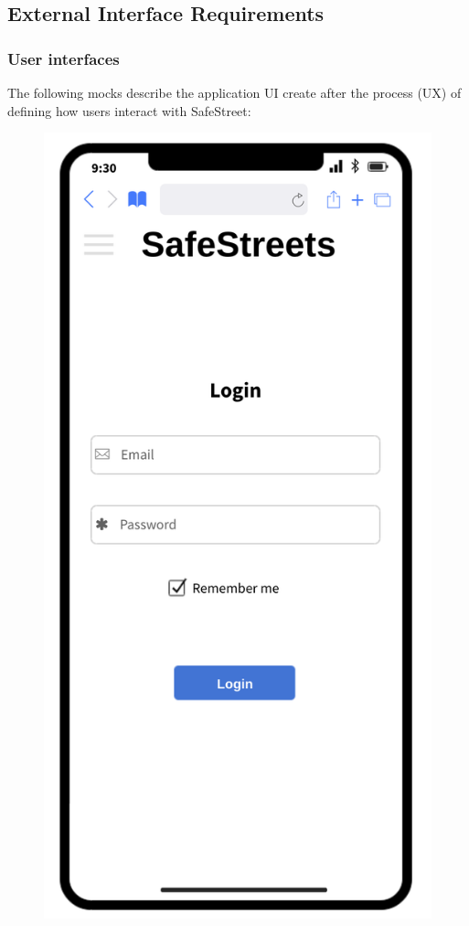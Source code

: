
\subsection{External Interface Requirements}
\subsubsection{User interfaces}
The following mocks describe the application UI create after the process (UX) of defining how users interact with SafeStreet:

	\begin{figure}[H]
		\centering
		\begin{minipage}[b]{0.40\textwidth}
			\includegraphics[width=\textwidth]{Images/login.png}

\end{minipage}
\end{figure}
